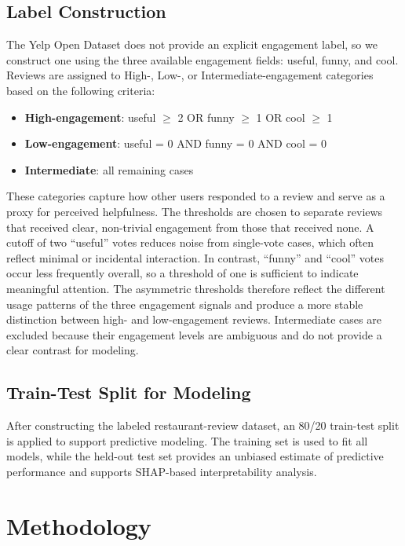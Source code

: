 \documentclass[12pt]{article}
\begin{document}
\subsection{Label Construction}

The Yelp Open Dataset does not provide an explicit engagement label, so we construct one using the three available engagement fields: useful, funny, and cool. Reviews are assigned to High-, Low-, or Intermediate-engagement categories based on the following criteria:

\begin{itemize}
\item \textbf{High-engagement}: useful $\ge$ 2 OR funny $\ge$ 1 OR cool $\ge$ 1
\item \textbf{Low-engagement}: useful = 0 AND funny = 0 AND cool = 0
\item \textbf{Intermediate}: all remaining cases
\end{itemize}

These categories capture how other users responded to a review and serve as a proxy for perceived helpfulness. The thresholds are chosen to separate reviews that received clear, non-trivial engagement from those that received none. A cutoff of two “useful” votes reduces noise from single-vote cases, which often reflect minimal or incidental interaction. In contrast, “funny” and “cool” votes occur less frequently overall, so a threshold of one is sufficient to indicate meaningful attention. The asymmetric thresholds therefore reflect the different usage patterns of the three engagement signals and produce a more stable distinction between high- and low-engagement reviews. Intermediate cases are excluded because their engagement levels are ambiguous and do not provide a clear contrast for modeling.

\subsection{Train-Test Split for Modeling}
After constructing the labeled restaurant-review dataset, an 80/20 train-test split is applied to support predictive modeling. The training set is used to fit all models, while the held-out test set provides an unbiased estimate of predictive performance and supports SHAP-based interpretability analysis.



\section{Methodology}
\end{document}
